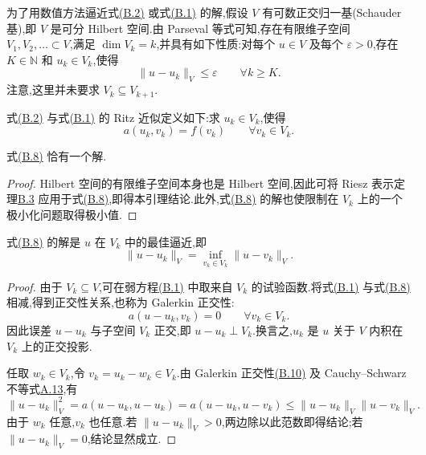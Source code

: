 \begin{note}\label{note:appendix-b-5}
为了用数值方法逼近式\hyperref[eq:appendix-b-2]{(B.2)} 或式\hyperref[eq:appendix-b-1]{(B.1)} 的解,假设 $V$ 有可数正交归一基(Schauder 基),即 $V$ 是可分 Hilbert 空间.由 Parseval 等式可知,存在有限维子空间 $V_1,V_2,\ldots\subset V$,满足 $\dim V_k=k$,并具有如下性质:对每个 $u\in V$ 及每个 $\varepsilon>0$,存在 $K\in\mathbb N$ 和 $u_k\in V_k$,使得
\begin{equation}\label{eq:appendix-b-7}
 \|u-u_k\|_V\le\varepsilon\qquad \forall k\ge K.
\end{equation}
注意,这里并未要求 $V_k\subseteq V_{k+1}$.

式\hyperref[eq:appendix-b-2]{(B.2)} 与式\hyperref[eq:appendix-b-1]{(B.1)} 的 Ritz 近似定义如下:求 $u_k\in V_k$,使得
\begin{equation}\label{eq:appendix-b-8}
 a(u_k,v_k)=f(v_k)\qquad \forall v_k\in V_k.
\end{equation}
\end{note}

\begin{lemma}[式(B.8)解的存在唯一性]\label{lem:appendix-b-6}
式\hyperref[eq:appendix-b-8]{(B.8)} 恰有一个解.
\end{lemma}
\begin{proof}
Hilbert 空间的有限维子空间本身也是 Hilbert 空间,因此可将 Riesz 表示定理\hyperref[thm:appendix-b-3]{B.3} 应用于式\hyperref[eq:appendix-b-8]{(B.8)},即得本引理结论.此外,式\hyperref[eq:appendix-b-8]{(B.8)} 的解也使限制在 $V_k$ 上的一个极小化问题取得极小值.
\end{proof}

\begin{lemma}[最佳逼近性质]\label{lem:appendix-b-7}
式\hyperref[eq:appendix-b-8]{(B.8)} 的解是 $u$ 在 $V_k$ 中的最佳逼近,即
\begin{equation}\label{eq:appendix-b-9}
 \|u-u_k\|_V=\inf_{v_k\in V_k}\|u-v_k\|_V.
\end{equation}
\end{lemma}
\begin{proof}
由于 $V_k\subseteq V$,可在弱方程\hyperref[eq:appendix-b-1]{(B.1)} 中取来自 $V_k$ 的试验函数.将式\hyperref[eq:appendix-b-1]{(B.1)} 与式\hyperref[eq:appendix-b-8]{(B.8)} 相减,得到正交性关系,也称为 Galerkin 正交性:
\begin{equation}\label{eq:appendix-b-10}
 a(u-u_k,v_k)=0\qquad \forall v_k\in V_k.
\end{equation}
因此误差 $u-u_k$ 与子空间 $V_k$ 正交,即 $u-u_k\perp V_k$.换言之,$u_k$ 是 $u$ 关于 $V$ 内积在 $V_k$ 上的正交投影.

任取 $w_k\in V_k$,令 $v_k=u_k-w_k\in V_k$.由 Galerkin 正交性\hyperref[eq:appendix-b-10]{(B.10)} 及 Cauchy--Schwarz 不等式\hyperref[lem:appendix-a-13]{A.13},有
\[
 \|u-u_k\|_V^2
 =a(u-u_k,u-u_k)
 =a(u-u_k,u-v_k)
 \le \|u-u_k\|_V\|u-v_k\|_V.
\]
由于 $w_k$ 任意,$v_k$ 也任意.若 $\|u-u_k\|_V>0$,两边除以此范数即得结论;若 $\|u-u_k\|_V=0$,结论显然成立.
\end{proof}

